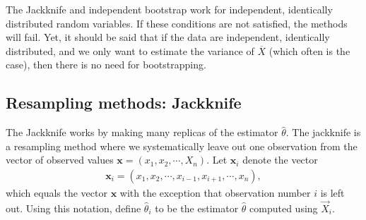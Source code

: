 \documentclass[letterpaper,10pt,english]{sphinxmanual}
\begin{document}
The Jackknife and independent bootstrap work for
independent, identically distributed random variables.
If these conditions are not
satisfied, the methods will fail.  Yet, it should be said that if the data are
independent, identically distributed, and we only want to estimate the
variance of \(\overline{X}\) (which often is the case), then there is no
need for bootstrapping.


\subsection{Resampling methods: Jackknife}
\label{\detokenize{chapter4:resampling-methods-jackknife}}
The Jackknife works by making many replicas of the estimator \(\widehat{\theta}\).
The jackknife is a resampling method where we systematically leave out one observation from the vector of observed values \(\boldsymbol{x} = (x_1,x_2,\cdots,X_n)\).
Let \(\boldsymbol{x}_i\) denote the vector
\begin{equation*}
\begin{split}
\boldsymbol{x}_i = (x_1,x_2,\cdots,x_{i-1},x_{i+1},\cdots,x_n),
\end{split}
\end{equation*}
which equals the vector \(\boldsymbol{x}\) with the exception that observation
number \(i\) is left out. Using this notation, define
\(\widehat{\theta}_i\) to be the estimator
\(\widehat{\theta}\) computed using \(\vec{X}_i\).
\end{document}
